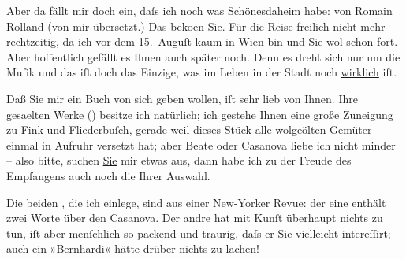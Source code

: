 \pstart
           Aber da fällt mir doch ein, daſs ich noch was Schönes\introOben{}daheim\introOben{} habe: von Romain
                  Rolland (von mir übersetzt.) Das beko{\geminationm}en Sie.
               Für die Reise freilich nicht mehr rechtzeitig, da ich vor dem 15. Auguſt
               kaum in Wien bin und Sie wol schon fort. Aber
               hoffentlich gefällt es Ihnen auch später noch. Denn es dreht sich nur um die Muſik
               und das iſt doch das Einzige, was im Leben in der Stadt  noch \uline{wirklich} iſt.\pend
           
\pstart
           Daß Sie mir ein Buch von sich geben wollen, iſt sehr lieb von Ihnen. Ihre gesa{\geminationm}elten Werke
                  (\label{K_L02575-1v}\label{K_L02575-1}) besitze ich natürlich; ich gestehe {\pb}Ihnen eine große Zuneigung zu Fink und Fliederbuſch, gerade weil dieses Stück
               alle wolgeölten Gemüter einmal in Aufruhr versetzt hat; aber Beate oder Casanova
               liebe ich nicht minder – also bitte, suchen \uline{Sie} mir
               etwas aus, dann habe ich zu der Freude des Empfangens auch noch die Ihrer
               Auswahl.\pend
           
\pstart
           Die beiden \label{K_L02575-2v}\label{K_L02575-2}, die ich einlege,
               sind aus einer New-Yorker Revue: der eine
               enthält zwei Worte über den Casanova. Der andre
               hat mit Kunſt überhaupt nichts zu tun, iſt aber menſchlich so packend und traurig,
               daſs er Sie vielleicht intereſſirt; auch ein »Bernhardi« hätte drüber nichts zu lachen! \pend
           
